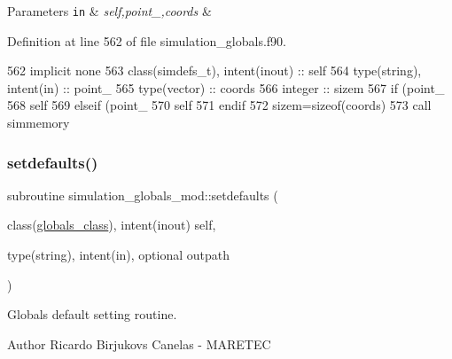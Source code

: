 \begin{DoxyParams}[1]{Parameters}
\mbox{\tt in}  & {\em self,point\+\_\+,coords} & \\
\hline
\end{DoxyParams}


Definition at line 562 of file simulation\+\_\+globals.\+f90.


\begin{DoxyCode}
562     \textcolor{keywordtype}{implicit none}
563     \textcolor{keywordtype}{class}(simdefs\_t), \textcolor{keywordtype}{intent(inout)} :: self
564     \textcolor{keywordtype}{type}(string), \textcolor{keywordtype}{intent(in)} :: point\_
565     \textcolor{keywordtype}{type}(vector) :: coords
566     \textcolor{keywordtype}{integer} :: sizem
567     \textcolor{keywordflow}{if} (point\_%
568         self%
569     \textcolor{keywordflow}{elseif} (point\_%
570         self%
571 \textcolor{keywordflow}{    endif}
572     sizem=sizeof(coords)
573     \textcolor{keyword}{call }simmemory%
\end{DoxyCode}
\mbox{\label{namespacesimulation__globals__mod_a11bedd9242e49b12d9e305d45ef9ea00}} 
\subsubsection{\texorpdfstring{setdefaults()}{setdefaults()}}
{\footnotesize\ttfamily subroutine simulation\+\_\+globals\+\_\+mod\+::setdefaults (\begin{DoxyParamCaption}\item[{class(\mbox{\hyperlink{structsimulation__globals__mod_1_1globals__class}{globals\+\_\+class}}), intent(inout)}]{self,  }\item[{type(string), intent(in), optional}]{outpath }\end{DoxyParamCaption})\hspace{0.3cm}{\ttfamily [private]}}



Globals default setting routine. 

\begin{DoxyAuthor}{Author}
Ricardo Birjukovs Canelas -\/ M\+A\+R\+E\+T\+EC 
\end{DoxyAuthor}

